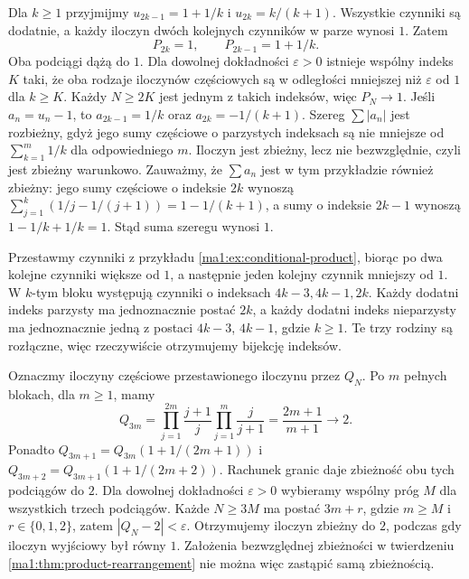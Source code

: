 \begin{przyklad}
\label{ma1:ex:conditional-product}
Dla $k\ge1$ przyjmijmy $u_{2k-1}=1+1/k$ i $u_{2k}=k/(k+1)$. Wszystkie czynniki są dodatnie, a każdy iloczyn dwóch kolejnych czynników w parze wynosi $1$. Zatem
\[
 P_{2k}=1,\qquad P_{2k-1}=1+1/k.
\]
Oba podciągi dążą do $1$. Dla dowolnej dokładności $\varepsilon>0$ istnieje wspólny indeks $K$ taki, że oba rodzaje iloczynów częściowych są w odległości mniejszej niż $\varepsilon$ od $1$ dla $k\ge K$. Każdy $N\ge2K$ jest jednym z takich indeksów, więc $P_N\to1$. Jeśli $a_n=u_n-1$, to $a_{2k-1}=1/k$ oraz $a_{2k}=-1/(k+1)$. Szereg $\sum|a_n|$ jest rozbieżny, gdyż jego sumy częściowe o parzystych indeksach są nie mniejsze od $\sum_{k=1}^m1/k$ dla odpowiedniego $m$. Iloczyn jest zbieżny, lecz nie bezwzględnie, czyli jest zbieżny warunkowo. Zauważmy, że $\sum a_n$ jest w tym przykładzie również zbieżny: jego sumy częściowe o indeksie $2k$ wynoszą $\sum_{j=1}^k(1/j-1/(j+1))=1-1/(k+1)$, a sumy o indeksie $2k-1$ wynoszą $1-1/k+1/k=1$. Stąd suma szeregu wynosi $1$.
\end{przyklad}

\begin{przyklad}
\label{ma1:ex:conditional-product-rearranged}
Przestawmy czynniki z przykładu \ref{ma1:ex:conditional-product}, biorąc po dwa kolejne czynniki większe od $1$, a następnie jeden kolejny czynnik mniejszy od $1$. W $k$-tym bloku występują czynniki o indeksach $4k-3,4k-1,2k$. Każdy dodatni indeks parzysty ma jednoznacznie postać $2k$, a każdy dodatni indeks nieparzysty ma jednoznacznie jedną z postaci $4k-3$, $4k-1$, gdzie $k\ge1$. Te trzy rodziny są rozłączne, więc rzeczywiście otrzymujemy bijekcję indeksów.

Oznaczmy iloczyny częściowe przestawionego iloczynu przez $Q_N$. Po $m$ pełnych blokach, dla $m\ge1$, mamy
\[
 Q_{3m}=\prod_{j=1}^{2m}\frac{j+1}{j}
          \prod_{j=1}^{m}\frac{j}{j+1}
        =\frac{2m+1}{m+1}\longrightarrow2.
\]
Ponadto $Q_{3m+1}=Q_{3m}(1+1/(2m+1))$ i $Q_{3m+2}=Q_{3m+1}(1+1/(2m+2))$. Rachunek granic daje zbieżność obu tych podciągów do $2$. Dla dowolnej dokładności $\varepsilon>0$ wybieramy wspólny próg $M$ dla wszystkich trzech podciągów. Każde $N\ge3M$ ma postać $3m+r$, gdzie $m\ge M$ i $r\in\{0,1,2\}$, zatem $|Q_N-2|<\varepsilon$. Otrzymujemy iloczyn zbieżny do $2$, podczas gdy iloczyn wyjściowy był równy $1$. Założenia bezwzględnej zbieżności w twierdzeniu \ref{ma1:thm:product-rearrangement} nie można więc zastąpić samą zbieżnością.
\end{przyklad}

